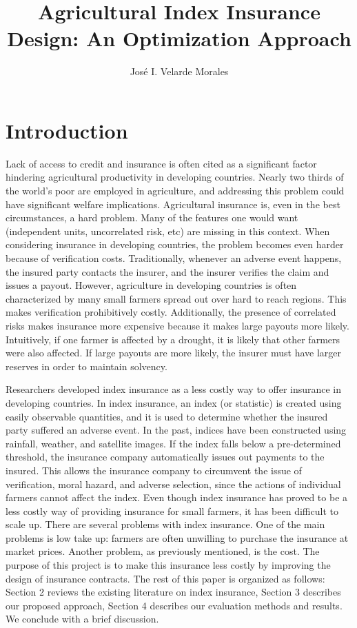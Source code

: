 \documentclass[11pt]{article}
\title{Agricultural Index Insurance Design: An Optimization Approach}
\author{José I. Velarde Morales}
\begin{document}
\maketitle
\tableofcontents

\section{Introduction}
Lack of access to credit and insurance is often cited as a significant factor hindering agricultural productivity in developing countries. Nearly two thirds of the world's poor are employed in agriculture, and addressing this problem could have significant welfare implications. Agricultural insurance is, even in the best circumstances, a hard problem. Many of the features one would want (independent units, uncorrelated risk, etc) are missing in this context. When considering insurance in developing countries, the problem becomes even harder because of verification costs. Traditionally, whenever an adverse event happens, the insured party contacts the insurer, and the insurer verifies the claim and issues a payout. However, agriculture in developing countries is often characterized by many small farmers spread out over hard to reach regions. This makes verification prohibitively costly. Additionally, the presence of correlated risks makes insurance more expensive because it makes large payouts more likely. Intuitively, if one farmer is affected by a drought, it is likely that other farmers were also affected. If large payouts are more likely, the insurer must have larger reserves in order to maintain solvency. 

Researchers developed index insurance as a less costly way to offer insurance in developing countries. In index insurance, an index (or statistic) is created using easily observable quantities, and it is used to determine whether the insured party suffered an adverse event. In the past, indices have been constructed using rainfall, weather, and satellite images. If the index falls below a pre-determined threshold, the insurance company automatically issues out payments to the insured. This allows the insurance company to circumvent the issue of verification, moral hazard, and adverse selection, since the actions of individual farmers cannot affect the index. Even though index insurance has proved to be a less costly way of providing insurance for small farmers, it has been difficult to scale up. There are several problems with index insurance. One of the main problems is low take up: farmers are often unwilling to purchase the insurance at market prices. Another problem, as previously mentioned, is the cost. The purpose of this project is to make this insurance less costly by improving the design of insurance contracts. The rest of this paper is organized as follows: Section 2 reviews the existing literature on index insurance, Section 3 describes our proposed approach, Section 4 describes our evaluation methods and results. We conclude with a brief discussion. 
\end{document}

